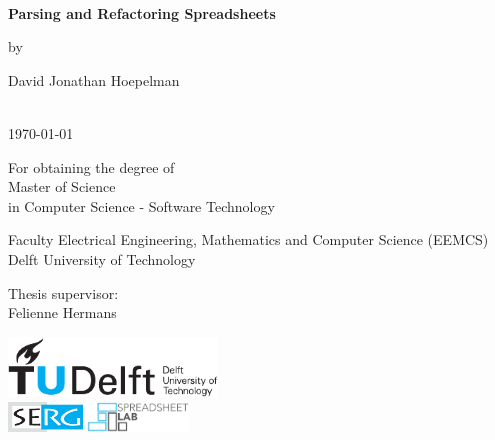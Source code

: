\thispagestyle{empty}
\onecolumn
{%
\sffamily
\centering

~\vspace{\fill}

{\huge \bfseries
Parsing and Refactoring Spreadsheets
}

\vspace{2.0cm}

by

\vspace{2.0cm}

{\LARGE
David Jonathan Hoepelman
}

\vspace{3.0cm}

 \\
\today

\vspace{2.5cm}

For obtaining the degree of \\
Master of Science \\
in Computer Science - Software Technology \\

\vspace{0.5cm}

Faculty Electrical Engineering, Mathematics and Computer Science (EEMCS)\\
Delft University of Technology

\vspace{0.5cm}

Thesis supervisor: \\
Felienne Hermans

\vspace{1.5cm}

\includegraphics[height=16mm]{0-title/tudelft.pdf}
\\ %
\vspace{0.75cm}
\includegraphics[height=8mm]{0-title/serg}
\hspace{0.5cm}
\includegraphics[height=8mm]{0-title/spreadsheet-lab}

\vspace{\fill}

}